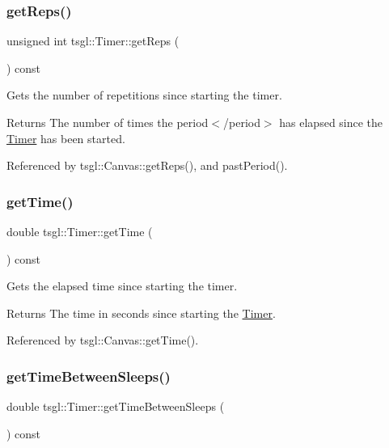 \subsubsection{\texorpdfstring{get\+Reps()}{getReps()}}
{\footnotesize\ttfamily unsigned int tsgl\+::\+Timer\+::get\+Reps (\begin{DoxyParamCaption}{ }\end{DoxyParamCaption}) const}



Gets the number of repetitions since starting the timer. 

\begin{DoxyReturn}{Returns}
The number of times the {\ttfamily period$<$/period$>$ has elapsed since the \hyperlink{classtsgl_1_1_timer}{Timer} has been started. }
\end{DoxyReturn}


Referenced by tsgl\+::\+Canvas\+::get\+Reps(), and past\+Period().

\mbox{\label{classtsgl_1_1_timer_a759f3174974f82f97abc8c2f7535d715}} 
\subsubsection{\texorpdfstring{get\+Time()}{getTime()}}
{\footnotesize\ttfamily double tsgl\+::\+Timer\+::get\+Time (\begin{DoxyParamCaption}{ }\end{DoxyParamCaption}) const}



Gets the elapsed time since starting the timer. 

\begin{DoxyReturn}{Returns}
The time in seconds since starting the \hyperlink{classtsgl_1_1_timer}{Timer}. 
\end{DoxyReturn}


Referenced by tsgl\+::\+Canvas\+::get\+Time().

\mbox{\label{classtsgl_1_1_timer_a1ade9f9a03047e2604622bf4ae16347b}} 
\subsubsection{\texorpdfstring{get\+Time\+Between\+Sleeps()}{getTimeBetweenSleeps()}}
{\footnotesize\ttfamily double tsgl\+::\+Timer\+::get\+Time\+Between\+Sleeps (\begin{DoxyParamCaption}{ }\end{DoxyParamCaption}) const}



